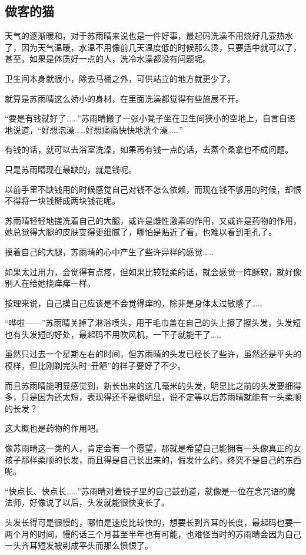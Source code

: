 \subsection{做客的猫}

天气的逐渐暖和，对于苏雨晴来说也是一件好事，最起码洗澡不用烧好几壶热水了，因为天气温暖，水温不用像前几天温度低的时候那么烫，只要适中就可以了，甚至，如果是体质好一点的人，洗冷水澡都没有问题呢。

卫生间本身就很小，除去马桶之外，可供站立的地方就更少了。

就算是苏雨晴这么娇小的身材，在里面洗澡都觉得有些施展不开。

“要是有钱就好了……”苏雨晴搬了一张小凳子坐在卫生间狭小的空地上，自言自语地说道，“好想泡澡……好想痛痛快快地洗个澡……”

有钱的话，就可以去浴室洗澡，如果再有钱一点的话，去蒸个桑拿也不成问题。

只是苏雨晴现在最缺的，就是钱呢。

以前手里不缺钱用的时候感觉自己对钱不怎么依赖，而现在钱不够用的时候，却恨不得将一块钱掰成两块钱花呢。

苏雨晴轻轻地搓洗着自己的大腿，或许是雌性激素的作用，又或许是药物的作用，她总觉得大腿的皮肤变得更细腻了，哪怕是贴近了看，也难以看到毛孔了。

摸着自己的大腿，苏雨晴的心中产生了些许异样的感觉……

如果太过用力，会觉得有点疼，但如果比较轻柔的话，就会感觉一阵酥软，就好像别人在给她挠痒痒一样。

按理来说，自己摸自己应该是不会觉得痒的，除非是身体太过敏感了……

“哗啦——”苏雨晴关掉了淋浴喷头，用干毛巾盖在自己的头上擦了擦头发，头发短也有头发短的好处，最起码不用吹风机，一下子就能干了……

虽然只过去一个星期左右的时间，但苏雨晴的头发已经长了些许，虽然还是平头的模样，但比刚剃完头时“丑陋”的样子要好了不少。

而且苏雨晴能明显感觉到，新长出来的这几毫米的头发，明显比之前的头发要细得多，只是因为还太短，表现得还不是很明显，说不定等以后苏雨晴就能有一头柔顺的长发？

这大概也是药物的作用吧。

像苏雨晴这一类的人，肯定会有一个愿望，那就是希望自己能拥有一头像真正的女孩子那样柔顺的长发，而且得是自己长出来的，假发什么的，终究不是自己的东西呢。

“快点长、快点长……”苏雨晴对着镜子里的自己鼓劲道，就像是一位在念咒语的魔法师，好像说了以后，头发就能很快变长了。

头发长得可是很慢的，哪怕是速度比较快的，想要长到齐耳的长度，最起码也要一两个月的时间，慢的话三个月甚至半年也有可能，也难怪当时的苏雨晴会因为自己一头齐耳短发被剃成平头而那么愤恨了。

